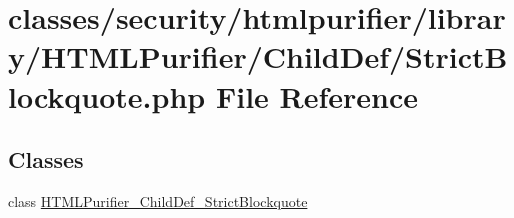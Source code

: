 \hypertarget{StrictBlockquote_8php}{\section{classes/security/htmlpurifier/library/\+H\+T\+M\+L\+Purifier/\+Child\+Def/\+Strict\+Blockquote.php File Reference}
\label{StrictBlockquote_8php}
}
\subsection*{Classes}
\begin{DoxyCompactItemize}
\item 
class \hyperlink{classHTMLPurifier__ChildDef__StrictBlockquote}{H\+T\+M\+L\+Purifier\+\_\+\+Child\+Def\+\_\+\+Strict\+Blockquote}
\end{DoxyCompactItemize}
